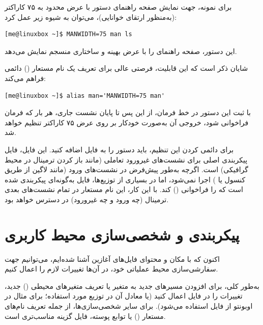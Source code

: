 برای نمونه، جهت نمایش صفحه راهنمای دستور  با عرض محدود به ۷۵ کاراکتر (به‌منظور ارتقای خوانایی)، می‌توان به شیوه زیر عمل کرد:

\begin{latin}
\begin{lstlisting}
[me@linuxbox ~]$ MANWIDTH=75 man ls
\end{lstlisting}
\end{latin}

این دستور، صفحه راهنمای  را با عرض بهینه و ساختاری منسجم نمایش می‌دهد.

شایان ذکر است که این قابلیت، فرصتی عالی برای تعریف یک نام مستعار () دائمی فراهم می‌کند:

\begin{latin}
\begin{lstlisting}
[me@linuxbox ~]$ alias man='MANWIDTH=75 man'
\end{lstlisting}
\end{latin}

با ثبت این دستور در خط فرمان، از این پس تا پایان نشست جاری، هر بار که فرمان  فراخوانی شود، خروجی آن به‌صورت خودکار بر روی عرض ۷۵ کاراکتر تنظیم خواهد شد.

برای دائمی کردن این تنظیم، باید دستور  را به فایل  اضافه کنید. این فایل، فایل پیکربندی اصلی برای نشست‌های غیرورود تعاملی (مانند باز کردن ترمینال در محیط گرافیکی) است. اگرچه  به‌طور پیش‌فرض در نشست‌های ورود (مانند لاگین از طریق کنسول یا ) اجرا نمی‌شود، اما در بسیاری از توزیع‌ها، فایل  به‌گونه‌ای پیکربندی شده است که  را فراخوانی () کند. با این کار، این نام مستعار در تمام نشست‌های بعدی ترمینال (چه ورود و چه غیرورود) در دسترس خواهد بود.

\section{پیکربندی و شخصی‌سازی محیط کاربری}

اکنون که با مکان و محتوای فایل‌های آغازین آشنا شده‌ایم، می‌توانیم جهت سفارشی‌سازی محیط عملیاتی خود، در آن‌ها تغییرات لازم را اعمال کنیم.

به‌طور کلی، برای افزودن مسیرهای جدید به متغیر  یا تعریف متغیرهای محیطی () جدید، تغییرات را در فایل  اعمال کنید (یا معادل آن در توزیع مورد استفاده؛ برای مثال در اوبونتو از فایل  استفاده می‌شود). برای سایر شخصی‌سازی‌ها، از جمله تعریف نام‌های مستعار () یا توابع پوسته، فایل  گزینه مناسب‌تری است.

